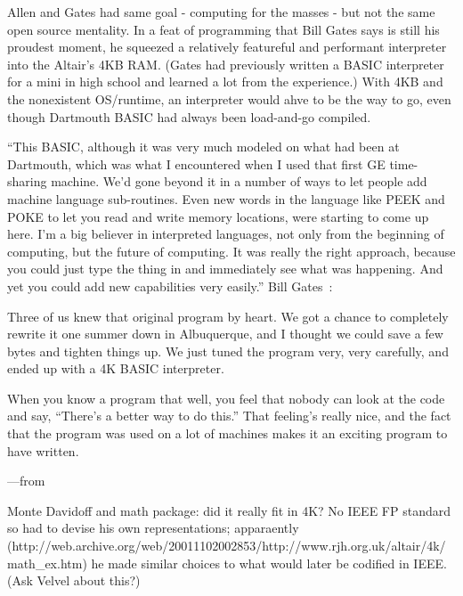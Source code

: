 \documentclass{article}
\begin{document}

Allen and Gates had same goal - computing for the masses - but not the
same open source mentality.  In a feat of programming that Bill Gates
says is still his proudest moment, he squeezed a relatively featureful
and performant interpreter into the Altair's 4KB RAM.  (Gates had
previously written a BASIC interpreter for  a mini in high school and
learned a lot from the experience.)  With 4KB and the nonexistent
OS/runtime, an interpreter would ahve to be the way to go, even though
Dartmouth BASIC had always been load-and-go compiled.


``This BASIC, although it was very much modeled on what had been at
Dartmouth, which was what I encountered when I used that first GE
time-sharing machine. We'd gone beyond it in a number of ways to let
people add machine language sub-routines. Even new words in the language
like PEEK and POKE to let you read and write memory locations, were
starting to come up here. I'm a big believer in interpreted languages,
not only from the beginning of computing, but the future of
computing. It was really the right approach, because you could just type
the thing in and immediately see what was happening. And yet you could
add new capabilities very easily.'' Bill Gates~\cite{smithsonian_interview}:


Three of us knew that original program by heart. We got a chance to
completely rewrite it one summer down in Albuquerque, and I thought we
could save a few bytes and tighten things up. We just tuned the program
very, very carefully, and ended up with a 4K BASIC interpreter.

When you know a program that well, you feel that nobody can look at the
code and say, ``There's a better way to do this.'' That feeling's really
nice, and the fact that the program was used on a lot of machines makes
it an exciting program to have written.

---from \cite{programmers_at_work}


Monte Davidoff and math package: did it really fit in 4K?  No IEEE FP
standard so had to devise his own representations; apparaently
(http://web.archive.org/web/20011102002853/http://www.rjh.org.uk/altair/4k/math\_ex.htm)
he made similar choices to what would later be codified in IEEE.  (Ask
Velvel about this?)
\end{document}
